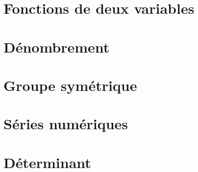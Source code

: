\documentclass[a4paper]{report}
\newcommand{\chap}[2][0]{
	\setcounter{chapter}{#1 - 1}
	\chapter{#2}
	\renewcommand*\parttitle{#2}
}
\begin{document}
	\chap[22]{Fonctions de deux variables}
	\renewcommand{\cwd}{../chap22}
	
	
	

	\chap[23]{Dénombrement}
	\renewcommand{\cwd}{../chap23}
	
	
	

	\chap[24]{Groupe symétrique}
	\renewcommand{\cwd}{../chap24}
	
	
	
	

	\chap[25]{Séries numériques}
	\renewcommand{\cwd}{../chap25}
	
	
	
	
	
	
	
	

	\chap[26]{Déterminant}
	\renewcommand{\cwd}{../chap26}
	
	
	
	

	\clearpage
	\lhead{}
	\renewcommand*\parttitle{Index}
	\printindex
\end{document}
